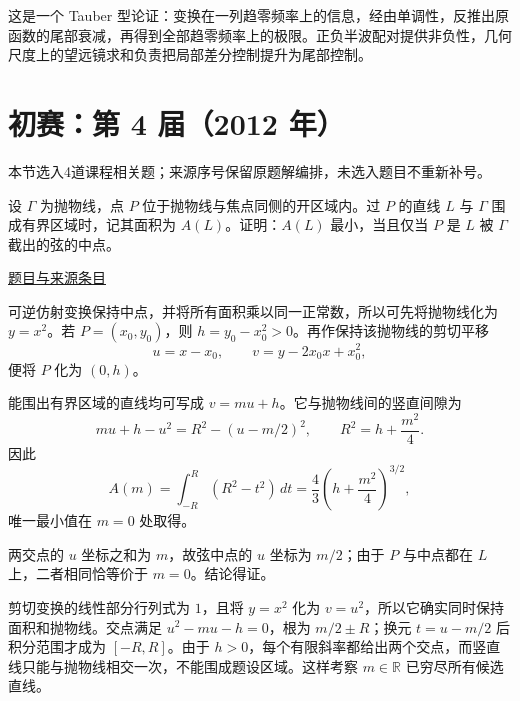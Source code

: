 \documentclass[UTF8,12pt,a4paper,fontset=fandol]{ctexart}
\begin{document}
\begin{remark}[方法与条件]这是一个 Tauber 型论证：变换在一列趋零频率上的信息，经由单调性，反推出原函数的尾部衰减，再得到全部趋零频率上的极限。正负半波配对提供非负性，几何尺度上的望远镜求和负责把局部差分控制提升为尾部控制。\end{remark}

\section{初赛：第 4 届（2012 年）}

本节选入4道课程相关题；来源序号保留原题解编排，未选入题目不重新补号。

\begin{example}[来源序号2]\label{ex:pre04-math:2}\label{pr:pre04-math:2}

设 $\Gamma$ 为抛物线，点 $P$ 位于抛物线与焦点同侧的开区域内。过 $P$ 的直线 $L$ 与 $\Gamma$ 围成有界区域时，记其面积为 $A(L)$。证明：$A(L)$ 最小，当且仅当 $P$ 是 $L$ 被 $\Gamma$ 截出的弦的中点。

\par\href{https://github.com/lzxcr/cmc-mathematics/blob/64916fa1fdbc3e444a652eca204d5669058ee321/src/problems/preliminary/04/02.md}{题目与来源条目}

\end{example}

\begin{solve}\label{ans:pre04-math:2}

可逆仿射变换保持中点，并将所有面积乘以同一正常数，所以可先将抛物线化为 $y=x^2$。若 $P=(x_0,y_0)$，则 $h=y_0-x_0^2>0$。再作保持该抛物线的剪切平移
\[
u=x-x_0,\qquad v=y-2x_0x+x_0^2,
\]
便将 $P$ 化为 $(0,h)$。

能围出有界区域的直线均可写成 $v=mu+h$。它与抛物线间的竖直间隙为
\[
mu+h-u^2=R^2-(u-m/2)^2,
\qquad R^2=h+\frac{m^2}{4}.
\]
因此
\[
A(m)=\int_{-R}^{R}(R^2-t^2)\,dt
=\frac43\left(h+\frac{m^2}{4}\right)^{3/2},
\]
唯一最小值在 $m=0$ 处取得。

两交点的 $u$ 坐标之和为 $m$，故弦中点的 $u$ 坐标为 $m/2$；由于 $P$ 与中点都在 $L$ 上，二者相同恰等价于 $m=0$。结论得证。

剪切变换的线性部分行列式为 $1$，且将 $y=x^2$ 化为 $v=u^2$，所以它确实同时保持面积和抛物线。交点满足 $u^2-mu-h=0$，根为 $m/2\pm R$；换元 $t=u-m/2$ 后积分范围才成为 $[-R,R]$。由于 $h>0$，每个有限斜率都给出两个交点，而竖直线只能与抛物线相交一次，不能围成题设区域。这样考察 $m\in\mathbb R$ 已穷尽所有候选直线。

\end{solve}
\end{document}
